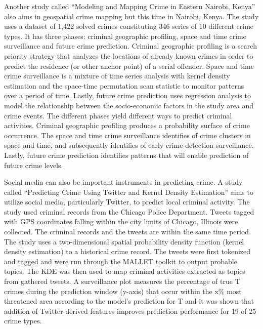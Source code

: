     Another study called “Modeling and Mapping Crime in Eastern Nairobi, Kenya” \cite{mburu2014modeling} also aims in geospatial crime mapping but this time in Nairobi, Kenya. The study uses a dataset of 1,422 solved crimes constituting 346 series of 10 different crime types. It has three phases: criminal geographic profiling, space and time crime surveillance and future crime prediction. Criminal geographic profiling is a search priority strategy that analyzes the locations of already known crimes in order to predict the residence (or other anchor point) of a serial offender. Space and time crime surveillance is a mixture of time series analysis with kernel density estimation and the space-time permutation scan statistic to monitor patterns over a period of time. Lastly, future crime prediction uses regression analysis to model the relationship between the socio-economic factors in the study area and crime events. The different phases yield different ways to predict criminal activities. Criminal geographic profiling produces a probability surface of crime occurrence. The space and time crime surveillance identifies of crime clusters in space and time, and subsequently identifies of early crime-detection surveillance. Lastly, future crime prediction identifies patterns that will enable prediction of future crime levels.

    Social media can also be important instruments in predicting crime. A study called “Predicting Crime Using Twitter and Kernel Density Estimation” \cite{gerber2014predicting} aims to utilize social media, particularly Twitter, to predict local criminal activity. The study used criminal records from the Chicago Police Department. Tweets tagged with GPS coordinates falling within the city limits of Chicago, Illinois were collected. The criminal records and the tweets are within the same time period. The study uses a two-dimensional spatial probability density function (kernel density estimation) to a historical crime record. The tweets were first tokenized and tagged and were run through the MALLET toolkit to output probable topics. The KDE was then used to map criminal activities extracted as topics from gathered tweets. A surveillance plot measures the percentage of true T crimes during the prediction window (y-axis) that occur within the x\% most threatened area according to the model's prediction for T and it was shown that addition of Twitter-derived features improves prediction performance for 19 of 25 crime types.

